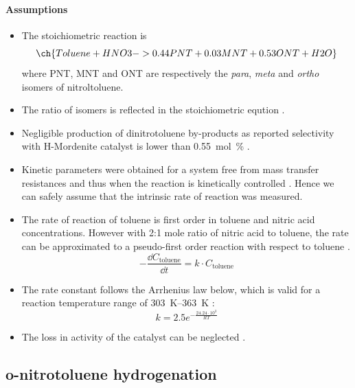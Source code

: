 \paragraph{Assumptions}
\begin{itemize}
    \item The stoichiometric reaction is
    \begin{equation}
        \ch{Toluene +  HNO3 -> 0.44 PNT + 0.03 MNT + 0.53 ONT + H2O}
    \end{equation}
    where PNT, MNT and ONT are respectively the \textit{para}, \textit{meta} and \textit{ortho} isomers of nitroltoluene.
    \item The ratio of isomers is reflected in the stoichiometric eqution \cite{smith_novel_1998}.
    \item Negligible production of dinitrotoluene by-products as reported selectivity with H-Mordenite catalyst is lower than \SI{0.55}{mol\percent} \cite{jeeru_kinetics_2018}.
    \item Kinetic parameters were obtained for a system free from mass transfer resistances and thus when the reaction is kinetically controlled \cite{jeeru_kinetics_2018}. Hence we can safely assume that the intrinsic rate of reaction was measured.
    \item The rate of reaction of toluene is first order in toluene and nitric acid concentrations. However with 2:1 mole ratio of nitric acid to toluene, the rate can be approximated to a pseudo-first order reaction with respect to toluene \cite{jeeru_kinetics_2018}.
    \begin{equation}
    - \frac{\dd C_\text{toluene}}{\dd t}=k \cdot C_\text{toluene} 
    \end{equation}
    \item The rate constant follows the Arrhenius law below, which is valid for a reaction temperature range of \SIrange{303}{363}{\K} \cite{jeeru_kinetics_2018}:
    \begin{equation}
        k=2.5e^{-\frac{24.24\cdot 10^{3}}{RT}}
    \end{equation}
    \item The loss in activity of the catalyst can be neglected \cite{jeeru_kinetics_2018}.
\end{itemize}

\subsection{o-nitrotoluene hydrogenation}
